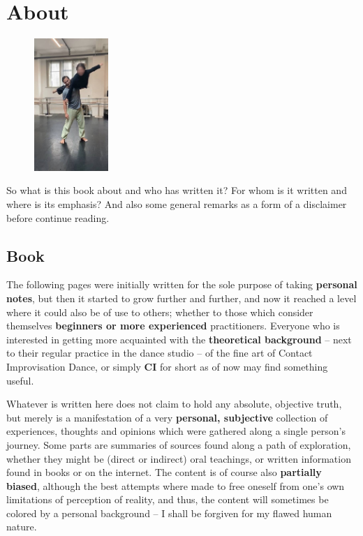 \section{About}\label{sec:about}

\begin{figure}
\centering
\includegraphics[width=0.25\textwidth]{images/about}
\end{figure}

So what is this book about and who has written it?
For whom is it written and where is its emphasis?
And also some general remarks as a form of a disclaimer before continue reading.

\subsection{Book}\label{subsec:book}

The following pages were initially written for the sole purpose of taking \textbf{personal notes}, but then it started to grow further and further, and now it reached a level where it could also be of use to others; whether to those which consider themselves \textbf{beginners or more experienced} practitioners.
Everyone who is interested in getting more acquainted with the \textbf{theoretical background} -- next to their regular practice in the dance studio -- of the fine art of Contact Improvisation Dance, or simply \textbf{CI} for short as of now may find something useful.

Whatever is written here does not claim to hold any absolute, objective truth, but merely is a manifestation of a very \textbf{personal, subjective} collection of experiences, thoughts and opinions which were gathered along a single person's journey.
Some parts are summaries of sources found along a path of exploration, whether they might be (direct or indirect) oral teachings, or written information found in books or on the internet.
The content is of course also \textbf{partially biased}, although the best attempts where made to free oneself from one's own limitations of perception of reality, and thus, the content will sometimes be colored by a personal background -- I shall be forgiven for my flawed human nature.

